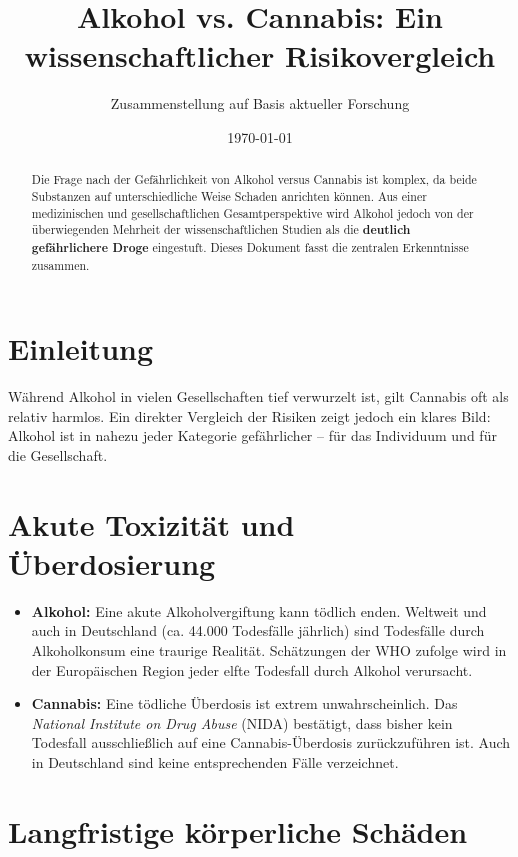 \documentclass[11pt,a4paper]{article}
\title{Alkohol vs. Cannabis: Ein wissenschaftlicher Risikovergleich}
\author{Zusammenstellung auf Basis aktueller Forschung}
\date{\today}
\begin{document}
	
	\maketitle
	
	\begin{abstract}
		Die Frage nach der Gefährlichkeit von Alkohol versus Cannabis ist komplex, da beide Substanzen auf unterschiedliche Weise Schaden anrichten können. Aus einer medizinischen und gesellschaftlichen Gesamtperspektive wird Alkohol jedoch von der überwiegenden Mehrheit der wissenschaftlichen Studien als die \textbf{deutlich gefährlichere Droge} eingestuft. Dieses Dokument fasst die zentralen Erkenntnisse zusammen.
	\end{abstract}
	
	\section{Einleitung}
	
	Während Alkohol in vielen Gesellschaften tief verwurzelt ist, gilt Cannabis oft als relativ harmlos. Ein direkter Vergleich der Risiken zeigt jedoch ein klares Bild: Alkohol ist in nahezu jeder Kategorie gefährlicher – für das Individuum und für die Gesellschaft.
	
	\section{Akute Toxizität und Überdosierung}
	
	\begin{itemize}[leftmargin=*, noitemsep]
		\item \textbf{Alkohol:} Eine akute Alkoholvergiftung kann tödlich enden. Weltweit und auch in Deutschland (ca. 44.000 Todesfälle jährlich\cite{who-deaths}\cite{dhs-deaths}) sind Todesfälle durch Alkoholkonsum eine traurige Realität. Schätzungen der WHO zufolge wird in der Europäischen Region jeder elfte Todesfall durch Alkohol verursacht\cite{who-deaths}.
		\item \textbf{Cannabis:} Eine tödliche Überdosis ist extrem unwahrscheinlich. Das \textit{National Institute on Drug Abuse} (NIDA) bestätigt, dass bisher kein Todesfall ausschließlich auf eine Cannabis-Überdosis zurückzuführen ist\cite{nida-no-overdose}. Auch in Deutschland sind keine entsprechenden Fälle verzeichnet\cite{bmg-cannabis}.
	\end{itemize}
	
	\section{Langfristige körperliche Schäden}
	
\end{document}
